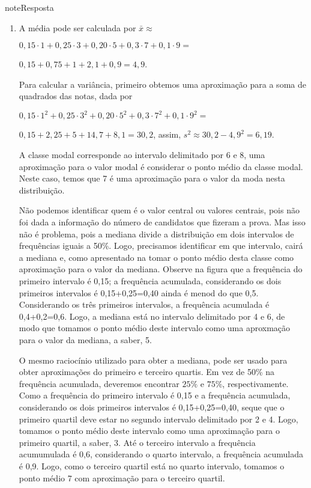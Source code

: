 \begin{sphinxadmonition}{note}{Resposta}
\begin{enumerate}
\item {} 
A média pode ser calculada por \(\bar{x}\approx\)

\(0,15\cdot 1+0,25\cdot 3+0,20\cdot 5+0,3 \cdot 7+0,1\cdot 9=\)

\(0,15+0,75+1+2,1+0,9=4,9\).

Para calcular a variância, primeiro obtemos uma aproximação para a soma de quadrados das notas, dada por

\(0,15\cdot 1^2+0,25\cdot 3^2+0,20\cdot 5^2+0,3 \cdot 7^2+0,1\cdot 9^2=\)

\(0,15+2,25+5+14,7+8,1=30,2\), assim, \(s^2\approx 30,2-4,9^2=6,19\).

A classe modal corresponde ao intervalo delimitado por 6 e 8, uma aproximação para o valor modal é considerar o ponto médio da classe modal. Neste caso, temos que 7 é uma aproximação para o valor da moda nesta distribuição.

Não podemos identificar quem é o valor central ou valores centrais, pois não foi dada a informação do número de candidatos que fizeram a prova. Mas isso não é problema, pois a mediana divide a distribuição em dois intervalos de frequências iguais a 50\%. Logo, precisamos identificar em que intervalo, cairá a mediana e, como apresentado na {\hyperref[\detokenize{PE104-1:sec-organizando1}]{}} tomar o ponto médio desta classe como aproximação para o valor da mediana. Observe na figura que a frequência do primeiro intervalo é 0,15; a frequência acumulada, considerando os dois primeiros intervalos é 0,15+0,25=0,40 ainda é menod do que 0,5. Considerando os três primeiros intervalos, a frequência acumulada é 0,4+0,2=0,6. Logo, a mediana está no intervalo delimitado por 4 e 6, de modo que tomamos o ponto médio deste intervalo como uma aproxmação para o valor da mediana, a saber, 5.

O mesmo raciocínio utilizado para obter a mediana, pode ser usado para obter aproximações do primeiro e terceiro quartis. Em vez de 50\% na frequência acumulada, deveremos encontrar $25\%$ e $75\%$, respectivamente. Como a frequência do primeiro intervalo é 0,15 e a frequência acumulada, considerando os dois primeiros intervalos é 0,15+0,25=0,40, seque que o primeiro quartil deve estar no segundo intervalo delimitado por 2 e 4. Logo, tomamos o ponto médio deste intervalo como uma aproximação para o primeiro quartil, a saber, 3. Até o terceiro intervalo a frequência acumumulada é 0,6, considerando o quarto intervalo, a frequência acumulada é 0,9. Logo, como o terceiro quartil está no quarto intervalo, tomamos o ponto médio  7 com aproximação para o terceiro quartil.


\end{enumerate}
\end{sphinxadmonition}
